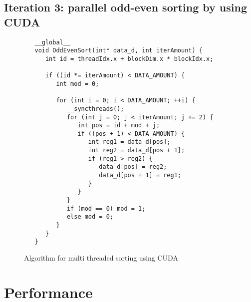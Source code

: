 \documentclass[a4paper,11pt]{article}
\begin{document}

\subsection{Iteration 3: parallel odd-even sorting by using CUDA}

\begin{figure}[ht]
\begin{lstlisting}
   __global__
   void OddEvenSort(int* data_d, int iterAmount) {
      int id = threadIdx.x + blockDim.x * blockIdx.x;
	
      if ((id *= iterAmount) < DATA_AMOUNT) {
         int mod = 0;
		
         for (int i = 0; i < DATA_AMOUNT; ++i) {
            __syncthreads();
            for (int j = 0; j < iterAmount; j += 2) {
               int pos = id + mod + j;
               if ((pos + 1) < DATA_AMOUNT) {
                  int reg1 = data_d[pos];
                  int reg2 = data_d[pos + 1];
                  if (reg1 > reg2) {
                     data_d[pos] = reg2;
                     data_d[pos + 1] = reg1;
                  }
               }
            }
            if (mod == 0) mod = 1;
            else mod = 0;
         }
      }
   }
\end{lstlisting}
\caption{Algorithm for multi threaded sorting using CUDA}
\end{figure}

\section{Performance}
\end{document}

